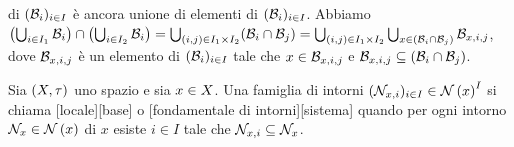  di $(\mathcal{B}_i)_{i \in I}$ \`e ancora unione di elementi di
$(\mathcal{B}_i)_{i \in I}$. Abbiamo
$\left (\bigcup_{i \in I_1} \mathcal{B}_i \right ) \cap
\left (\bigcup_{i \in I_2} \mathcal{B}_i \right ) =
\bigcup_{(i,j) \in I_1 \times I_2}
(\mathcal{B}_i \cap \mathcal{B}_j) =
\bigcup_{(i,j) \in I_1 \times I_2}
\bigcup_{x \in (\mathcal{B}_i \cap \mathcal{B}_j)}
\mathcal{B}_{x,i,j}$, dove $\mathcal{B}_{x,i,j}$ \`e un elemento
di $(\mathcal{B}_i)_{i \in I}$ tale che
$x \in \mathcal{B}_{x,i,j}$ e $\mathcal{B}_{x,i,j} \subseteq
(\mathcal{B}_i \cap \mathcal{B}_j)$. \EndProof
\begin{Definition}
	Sia $(X,\tau)$ uno spazio e sia
	$x \in X$. Una famiglia di intorni
	$(\Neighborhood_{x,i})_{i \in I} \in \Neighborhoods{x}^{I}$ si chiama
	[locale][base] o
	[fondamentale di intorni][sistema]
	quando per ogni intorno $\Neighborhood_x \in \Neighborhoods{x}$ di $x$ esiste $i \in I$
	tale che $\mathcal{N}_{x,i} \subseteq
	\mathcal{N}_x$.
\end{Definition}
